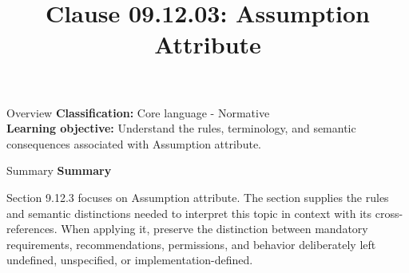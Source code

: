 \documentclass[10pt,letterpaper]{article}
\title{Clause 09.12.03: Assumption Attribute}
\author{}
\date{}
\begin{document}
\maketitle
\begin{CornellOverviewBox}{Overview}
\textbf{Classification:} Core language - Normative\\[2pt]
\textbf{Learning objective:} Understand the rules, terminology, and semantic consequences associated with Assumption attribute.
\end{CornellOverviewBox}\begin{CornellSummaryBox}{Summary}
{\sffamily\bfseries\color{Accent} Summary}\par\vspace{3pt}Section 9.12.3 focuses on Assumption attribute. The section supplies the rules and semantic distinctions needed to interpret this topic in context with its cross-references. When applying it, preserve the distinction between mandatory requirements, recommendations, permissions, and behavior deliberately left undefined, unspecified, or implementation-defined.
\end{CornellSummaryBox}
\end{document}
